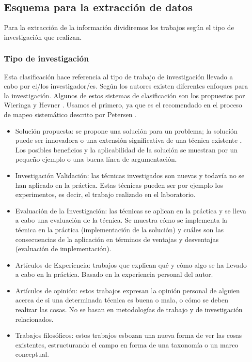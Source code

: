 \subsection{Esquema para la extracción de datos}

Para la extracción de la información dividiremos los trabajos según el tipo de investigación que realizan.

\subsubsection{Tipo de investigación}
Esta clasificación hace referencia al tipo de trabajo de investigación llevado a cabo por el/los investigador/es. Según los autores existen diferentes enfoques para la investigación. Algunos de estos sistemas de clasificación son los propuestos por Wieringa \cite{Wieringa:2005} y Hevner \cite{Hevner:2004}. Usamos el primero, ya que es el recomendado en el proceso de mapeo sistemático descrito por Petersen \cite{Petersen:2008}.
\begin{itemize}
\item Solución propuesta: se propone una solución para un problema; la solución puede ser innovadora o una extensión significativa de una técnica existente . Los posibles beneficios y la aplicabilidad de la solución se muestran por un pequeño ejemplo o una buena línea de argumentación.
\item Investigación Validación: las técnicas investigados son nuevas y todavía no se han aplicado en la práctica. Estas técnicas pueden ser por ejemplo los experimentos, es decir, el trabajo realizado en el laboratorio.
\item Evaluación de la Investigación:  las técnicas se aplican en la práctica y se lleva a cabo una evaluación de la técnica. Se muestra cómo se implementa la técnica en la práctica (implementación de la solución) y cuáles son las consecuencias de la aplicación en términos de ventajas y desventajas (evaluación de implementación).
\item Artículos de Experiencia: trabajos que explican qué y cómo algo se ha llevado a cabo en la práctica. Basado en la experiencia personal del autor.
\item Artículos de opinión: estos trabajos expresan la opinión personal de alguien acerca de si una determinada técnica es buena o mala, o cómo se deben realizar las cosas. No se basan en metodologías de trabajo y de investigación relacionados.
\item Trabajos filosóficos: estos trabajos esbozan una nueva forma de ver las cosas existentes, estructurando el campo en forma de una taxonomía o un marco conceptual.
\end{itemize}

